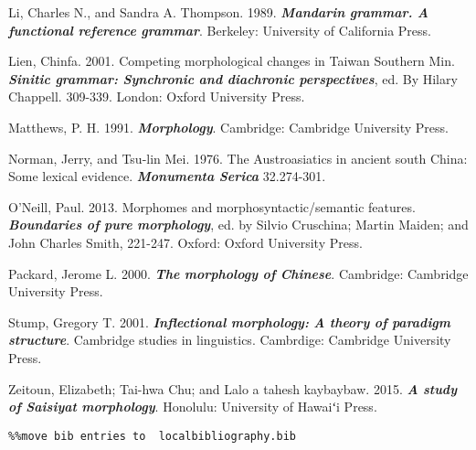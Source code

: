 \textrm{Li, Charles N., and Sandra A. Thompson. 1989.} \textrm{\textbf{\textit{Mandarin} \textit{grammar.} \textit{A} \textit{functional} \textit{reference} \textit{grammar}}}\textrm{.} \textrm{Berkeley: University of California Press.}

\textrm{Lien, Chinfa. 2001. Competing morphological changes in Taiwan Southern Min.} \textrm{\textbf{\textit{Sinitic} \textit{grammar:} \textit{Synchronic} \textit{and} \textit{diachronic} \textit{perspectives}}}\textrm{,} \textrm{ed. By Hilary Chappell. 309-339. London: Oxford University Press.}

\textrm{Matthews, P. H. 1991.} \textrm{\textbf{\textit{Morphology}}}\textrm{. Cambridge: Cambridge University Press.}

\textrm{Norman, Jerry, and Tsu-lin Mei. 1976. The Austroasiatics in ancient south China: Some lexical evidence.} \textrm{\textbf{\textit{Monumenta} \textit{Serica}}} \textrm{32.274-301.}

\textrm{O’Neill, Paul. 2013. Morphomes and morphosyntactic/semantic features.} \textrm{\textbf{\textit{Boundaries} \textit{of} \textit{pure} \textit{morphology}}}\textrm{, ed. by Silvio Cruschina; Martin Maiden; and John Charles Smith, 221-247. Oxford: Oxford University Press.}

\textrm{Packard, Jerome L. 2000.} \textrm{\textbf{\textit{The} \textit{morphology} \textit{of} \textit{Chinese}}}\textrm{.} \textrm{Cambridge: Cambridge University Press.}

\textrm{Stump, Gregory T. 2001.}\textrm{ }\textrm{\textbf{\textit{Inflectional} \textit{morphology:} \textit{A} \textit{theory} \textit{of} \textit{paradigm} \textit{structure}}}\textrm{. }\textrm{Cambridge studies in linguistics. Cambrdige: Cambridge University Press.}

\textrm{Zeitoun, Elizabeth; Tai-hwa Chu; and Lalo a tahesh kaybaybaw. 2015.} \textrm{\textbf{\textit{A} \textit{study} \textit{of} \textit{Saisiyat} \textit{morphology}}}\textrm{. Honolulu: University of Hawaiʻi Press.}


\begin{verbatim}%%move bib entries to  localbibliography.bib
\end{verbatim} 